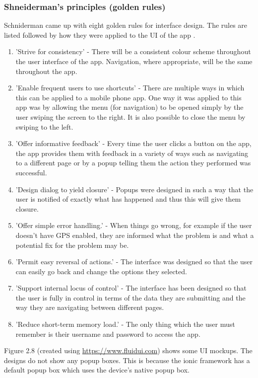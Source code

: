 \subsubsection{Shneiderman's principles (golden rules)}
Schniderman came up with eight golden rules for interface design. The rules are listed followed by how they were applied to the UI of the app \cite{sch}.
\begin{enumerate}
	\item 'Strive for consistency' - There will be a consistent colour scheme throughout the user interface of the app. Navigation, where appropriate, will be the same throughout the app.
	\item 'Enable frequent users to use shortcuts' - There are multiple ways in which this can be applied to a mobile phone app. One way it was applied to this app was by allowing the menu (for navigation) to be opened simply by the user swiping the screen to the right. It is also possible to close the menu by swiping to the left.
	\item 'Offer informative feedback' - Every time the user clicks a button on the app, the app provides them with feedback in a variety of ways such as navigating to a different page or by a popup telling them the action they performed was successful.
	\item 'Design dialog to yield closure' - Popups were designed in such a way that the user is notified of exactly what has happened and thus this will give them closure.
	\item 'Offer simple error handling.' - When things go wrong, for example if the user doesn't have GPS enabled, they are informed what the problem is and what a potential fix for the problem may be.
	\item 'Permit easy reversal of actions.' - The interface was designed so that the user can easily go back and change the options they selected.
	\item 'Support internal locus of control' - The interface has been designed so that the user is fully in control in terms of the data they are submitting and the way they are navigating between different pages.
	\item 'Reduce short-term memory load.' - The only thing which the user must remember is their username and password to access the app.
\end{enumerate}
Figure 2.8 (created using \url {https://www.fluidui.com}) shows some UI mockups. The designs do not show any popup boxes. This is because the ionic framework has a default popup box which uses the device's native popup box.
